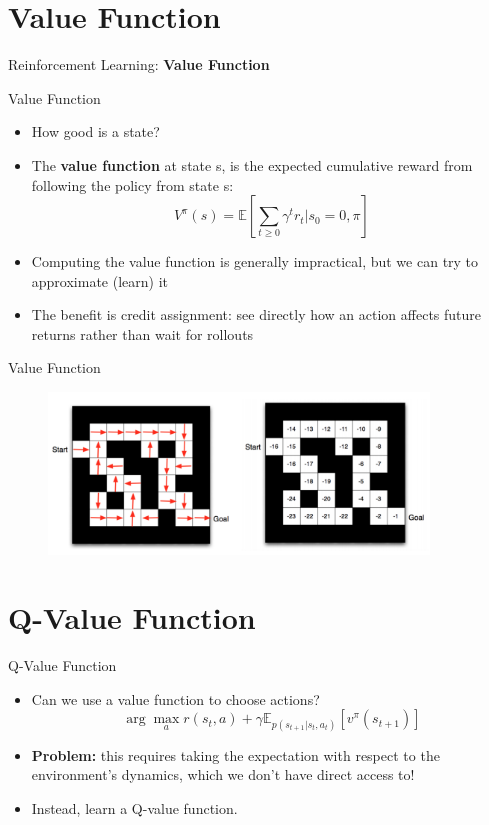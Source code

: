 \section{Value Function}
\begin{frame}{}
    \LARGE Reinforcement Learning: \textbf{Value Function}
\end{frame}

\begin{frame}{Value Function}
\begin{itemize}
    \item How good is a state?
    \pause
    \item The \textbf{value function} at state s, is the expected cumulative reward from following the policy from state s:
    $$V^{\pi}(s) = \mathbb{E} \left [ \sum_{t \geq 0} \gamma^t r_t | s_0=0, \pi \right ]$$
    \item Computing the value function is generally impractical, but we can try
to approximate (learn) it
    \item The benefit is credit assignment: see directly how an action affects
future returns rather than wait for rollouts

\end{itemize}

\end{frame}

\begin{frame}{Value Function}
\begin{figure}
\centering
\includegraphics[width=0.9\textwidth,height=0.9\textheight,keepaspectratio]{images/intro/value.png}
\end{figure}

\end{frame}

\section{Q-Value Function}
\begin{frame}{Q-Value Function}
\begin{itemize}
    \item Can we use a value function to choose actions?
    $$\arg \max_a r(s_t,a) + \gamma \mathbb{E}_{p(s_{t+1}|s_t, a_t)}\left [ v^{\pi}(s_{t+1}) \right ]$$
    \pause
    \item \textbf{Problem:} this requires taking the expectation with respect to the environment’s dynamics, which we don’t have direct access to!
    \item Instead, learn a Q-value function.

\end{itemize}
\end{frame}

